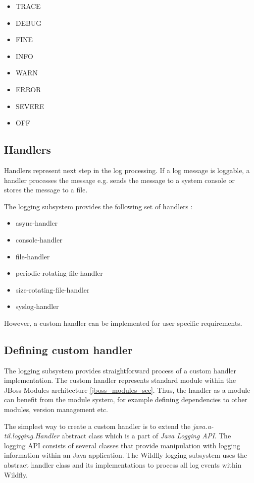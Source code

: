 \documentclass[12pt,oneside]{fithesis2}
\begin{document}
\begin{multicols}{2}
	\begin{itemize}
		\item TRACE
		\item DEBUG
		\item FINE
		\item INFO
		\item WARN
		\item ERROR
		\item SEVERE
		\item OFF
	\end{itemize}
\end{multicols}
\subsection{Handlers}
\label{handlers}
Handlers represent next step in the log processing. If a log message is loggable, a handler processes the message e.g. sends the message to a system console or stores the message to a file.

The logging subsystem provides the following set of handlers \cite{wildfly_doc}:
\begin{itemize}
	\item async-handler
	\item console-handler
	\item file-handler
	\item periodic-rotating-file-handler
	\item size-rotating-file-handler
	\item syslog-handler
\end{itemize}
\noindent
However, a custom handler can be implemented for user specific requirements.

\subsection{Defining custom handler}
\label{custom_handler}
The logging subsystem provides straightforward process of a custom handler implementation. The custom handler represents standard module within the JBoss Modules architecture \ref{jboss_modules_sec}. Thus, the handler as a module can benefit from the module system, for example defining dependencies to other modules, version management etc.

The simplest way to create a custom handler is to extend the \textit{java.u-til.logging.Handler} abstract class which is a part of \textit{Java Logging API}. The logging API consists of several classes that provide manipulation with logging information within an Java application. The Wildfly logging subsystem uses the abstract handler class and its implementations to process all log events within Wildfly.
\end{document}
